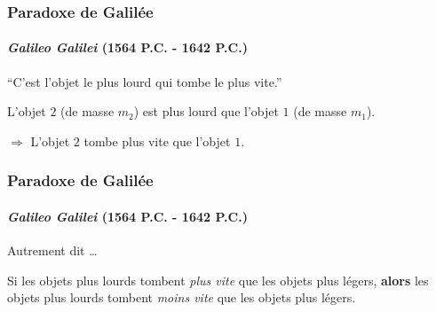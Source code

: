 \documentclass[usenames, dvipsnames]{beamer}
\begin{document}
\begin{frame}[plain]
\frametitle{Paradoxe de Galilée}
\framesubtitle{\textit{Galileo Galilei} (1564 P.C. - 1642 P.C.)}

\vspace{-8mm}
\begin{center}
``C'est l'objet le plus lourd qui tombe le plus vite.''
\end{center}

L'objet $2$ (de masse $m_2$) est plus lourd que l'objet $1$ (de masse $m_1$).

$\Rightarrow$ L'objet $2$ tombe plus vite que l'objet $1$.





\end{frame}

\begin{frame}[plain]
\frametitle{Paradoxe de Galilée}
\framesubtitle{\textit{Galileo Galilei} (1564 P.C. - 1642 P.C.)}

Autrement dit \dots

Si les objets plus lourds tombent \emph{plus vite} que les objets plus légers, \textbf{alors} les objets plus lourds tombent \emph{moins vite} que les objets plus légers.



\end{frame}
\end{document}
